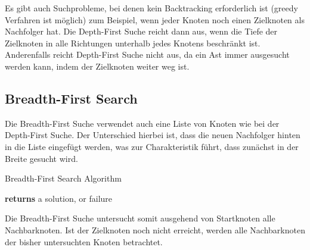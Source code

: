 Es gibt auch Suchprobleme, bei denen kein Backtracking erforderlich ist (greedy Verfahren ist möglich) zum Beispiel, wenn jeder Knoten noch einen Zielknoten als Nachfolger hat. Die Depth-First Suche reicht dann aus, wenn die Tiefe der Zielknoten in alle Richtungen unterhalb jedes Knotens beschränkt ist. Anderenfalls reicht Depth-First Suche nicht aus, da ein Ast immer ausgesucht werden kann, indem der Zielknoten weiter weg ist.\\

\subsection{Breadth-First Search}
\bigskip
Die Breadth-First Suche verwendet auch eine Liste von Knoten wie bei der Depth-First Suche. Der Unterschied hierbei ist, dass die neuen Nachfolger hinten in die Liste eingefügt werden, was zur Charakteristik führt, dass zunächst in der Breite gesucht wird.\\

\begin{algorithm}
\caption{Breadth-First Search Algorithm}
\begin{algorithmic}[1]
 \State \textbf{returns} a solution, or failure
\EndFunction
\EndFunction
\end{algorithmic}
\end{algorithm}

Die Breadth-First Suche untersucht somit ausgehend von Startknoten alle Nachbarknoten. Ist der Zielknoten noch nicht erreicht, werden alle Nachbarknoten der bisher untersuchten Knoten betrachtet.\\

